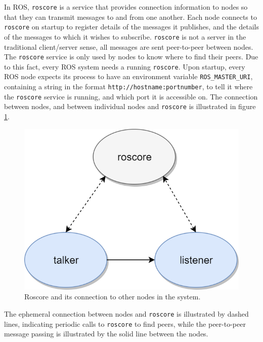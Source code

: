 In ROS, \lstinline[basicstyle=\ttfamily]{roscore} is a service that provides connection information to nodes so that they can transmit messages to and from one another. Each node connects to \lstinline[basicstyle=\ttfamily]{roscore} on startup to register details of the messages it publishes, and the details of the messages to which it wishes to subscribe. \lstinline[basicstyle=\ttfamily]{roscore} is not a server in the traditional client/server sense, all messages are sent peer-to-peer between nodes. The \lstinline[basicstyle=\ttfamily]{roscore} service is only used by nodes to know where to find their peers. Due to this fact, every ROS system needs a running \lstinline[basicstyle=\ttfamily]{roscore}. Upon startup, every ROS node expects its process to have an environment variable \lstinline[basicstyle=\ttfamily]{ROS_MASTER_URI}, containing a string in the format \lstinline[basicstyle=\ttfamily]{http://hostname:portnumber}, to tell it where the \lstinline[basicstyle=\ttfamily]{roscore} service is running, and which port it is accessible on. The connection between nodes, and between individual nodes and \lstinline[basicstyle=\ttfamily]{roscore} is illustrated in figure \ref{fig:roscore}.
\begin{figure}[H]
	\centering
	\includegraphics[width=.4\linewidth]{fig/roscore.png}
	\caption{Roscore and its connection to other nodes in the system.}
	\label{fig:roscore}
\end{figure}
The ephemeral connection between nodes and \lstinline[basicstyle=\ttfamily]{roscore} is illustrated by dashed lines, indicating periodic calls to \lstinline[basicstyle=\ttfamily]{roscore} to find peers, while the peer-to-peer message passing is illustrated by the solid line between the nodes.
\cleardoublepage